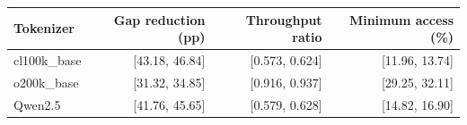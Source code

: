 \begin{tabular}{lrrr}\toprule
Tokenizer & Gap reduction (pp) & Throughput ratio & Minimum access (\%)\\\midrule
cl100k\_base & [43.18, 46.84] & [0.573, 0.624] & [11.96, 13.74]\\
o200k\_base & [31.32, 34.85] & [0.916, 0.937] & [29.25, 32.11]\\
Qwen2.5 & [41.76, 45.65] & [0.579, 0.628] & [14.82, 16.90]\\
\bottomrule\end{tabular}
